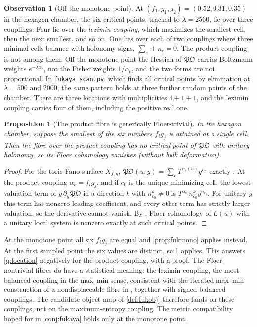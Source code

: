 \documentclass[11pt]{article}
\newtheorem{proposition}[theorem]{Proposition}
\theoremstyle{definition}
\newtheorem{observation}[theorem]{Observation}
\theoremstyle{remark}
\begin{document}
\begin{observation}[Off the monotone point]\label{obs:fukoff}
At $(f_1,g_1,g_2)=(0.52,0.31,0.35)$ in the hexagon chamber, the six critical points, tracked to $\lambda=2560$, lie over
three couplings. Four lie over the \emph{leximin coupling}, which maximizes the smallest cell, then the next smallest,
and so on. One lies over each of two couplings where three minimal cells balance with holonomy signs,
$\sum_c\pm n_c=0$. The product coupling is not among them. Off the monotone point the Hessian of $\mathfrak{PO}$ carries
Boltzmann weights $e^{-\lambda\alpha_c}$, not the Fisher weights $1/\alpha_c$, and the two forms are not proportional. In
\texttt{fukaya\_scan.py}, which finds all critical points by elimination at $\lambda=500$ and $2000$, the same pattern
holds at three further random points of the chamber. There are three locations with multiplicities $4+1+1$, and the
leximin coupling carries four of them, including the positive real one.
\end{observation}

\begin{proposition}[The product fibre is generically Floer-trivial]\label{prop:prodtrivial}
In the hexagon chamber, suppose the smallest of the six numbers $f_ig_j$ is attained at a single cell. Then the fibre over
the product coupling has no critical point of $\mathfrak{PO}$ with unitary holonomy, so its Floer cohomology vanishes
(without bulk deformation).
\end{proposition}
\begin{proof}
For the toric Fano surface $X_{f,g}$, $\mathfrak{PO}(u;y)=\sum_cT^{\alpha_c(u)}y^{n_c}$ exactly \cite{ChoOh2006}. At the product
coupling $\alpha_c=f_ig_j$, and if $c_0$ is the unique minimizing cell, the lowest-valuation term of $y\,\partial_y\mathfrak{PO}$ in a
direction $k$ with $n_{c_0}^k\ne0$ is $T^{\alpha_{c_0}}n_{c_0}^ky^{n_{c_0}}$. For unitary $y$ this term has nonzero leading
coefficient, and every other term has strictly larger valuation, so the derivative cannot vanish. By \cite{FOOO2010}, Floer
cohomology of $L(u)$ with a unitary local system is nonzero exactly at such critical points.
\end{proof}

At the monotone point all six $f_ig_j$ are equal and \cref{prop:fukmono} applies instead. At the first sampled point the
six values are distinct, so \cref{prop:prodtrivial} applies. This answers \cref{q:location} negatively for the product coupling, with a proof. The Floer-nontrivial fibres do have a statistical
meaning: the leximin coupling, the most balanced coupling in the max--min sense, consistent with the iterated max--min
construction of a nondisplaceable fibre in \cite{FOOO2010}, together with signed-balanced couplings. The candidate object
map of \cref{def:fukobj} therefore lands on these couplings, not on the maximum-entropy coupling. The metric
compatibility hoped for in \cref{conj:fukaya} holds only at the monotone point.
\end{document}
